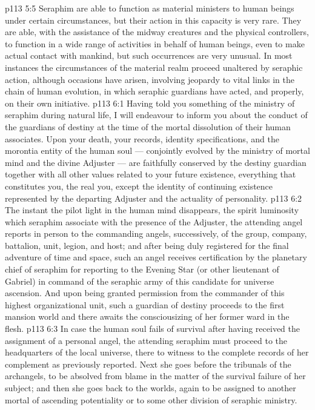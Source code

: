 \vs p113 5:5 \pc Seraphim are able to function as material ministers to human beings under certain circumstances, but their action in this capacity is very rare. They are able, with the assistance of the midway creatures and the physical controllers, to function in a wide range of activities in behalf of human beings, even to make actual contact with mankind, but such occurrences are very unusual. In most instances the circumstances of the material realm proceed unaltered by seraphic action, although occasions have arisen, involving jeopardy to vital links in the chain of human evolution, in which seraphic guardians have acted, and properly, on their own initiative.
\vs p113 6:1 Having told you something of the ministry of seraphim during natural life, I will endeavour to inform you about the conduct of the guardians of destiny at the time of the mortal dissolution of their human associates. Upon your death, your records, identity specifications, and the morontia entity of the human soul --- conjointly evolved by the ministry of mortal mind and the divine Adjuster --- are faithfully conserved by the destiny guardian together with all other values related to your future existence, everything that constitutes you, the real you, except the identity of continuing existence represented by the departing Adjuster and the actuality of personality.
\vs p113 6:2 The instant the pilot light in the human mind disappears, the spirit luminosity which seraphim associate with the presence of the Adjuster, the attending angel reports in person to the commanding angels, successively, of the group, company, battalion, unit, legion, and host; and after being duly registered for the final adventure of time and space, such an angel receives certification by the planetary chief of seraphim for reporting to the Evening Star (or other lieutenant of Gabriel) in command of the seraphic army of this candidate for universe ascension. And upon being granted permission from the commander of this highest organizational unit, such a guardian of destiny proceeds to the first mansion world and there awaits the consciousizing of her former ward in the flesh.
\vs p113 6:3 \pc In case the human soul fails of survival after having received the assignment of a personal angel, the attending seraphim must proceed to the headquarters of the local universe, there to witness to the complete records of her complement as previously reported. Next she goes before the tribunals of the archangels, to be absolved from blame in the matter of the survival failure of her subject; and then she goes back to the worlds, again to be assigned to another mortal of ascending potentiality or to some other division of seraphic ministry.
